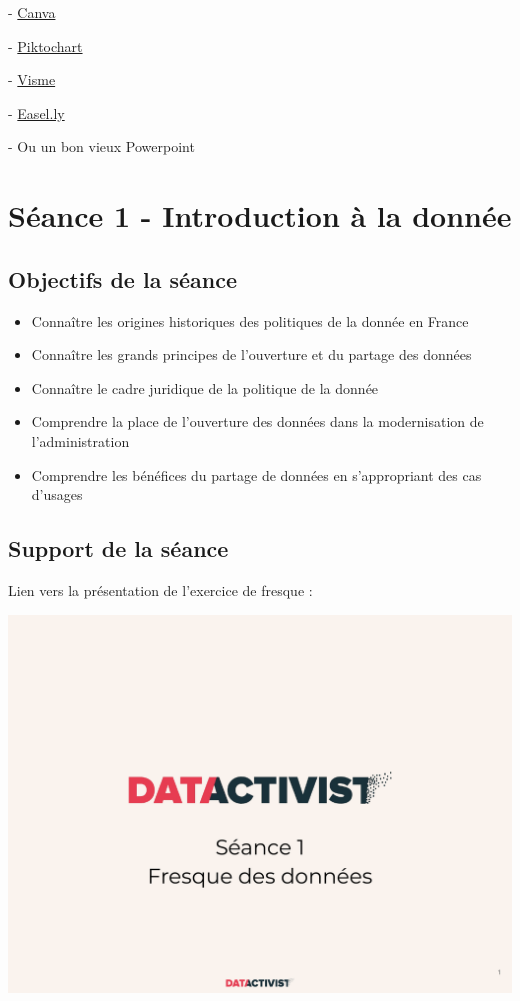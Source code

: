 \documentclass[
  letterpaper,
  DIV=11,
  numbers=noendperiod]{scrreprt}
\begin{document}
- \href{https://www.canva.com/}{Canva}

- \href{https://piktochart.com/}{Piktochart}

- \href{https://www.visme.co/make-infographics/}{Visme}

- \href{https://www.easel.ly/}{Easel.ly}

- Ou un bon vieux Powerpoint


\hypertarget{suxe9ance-1---introduction-uxe0-la-donnuxe9e}{%
\chapter{Séance 1 - Introduction à la
donnée}\label{suxe9ance-1---introduction-uxe0-la-donnuxe9e}}

\hypertarget{objectifs-de-la-suxe9ance}{%
\section{Objectifs de la séance}\label{objectifs-de-la-suxe9ance}}

\begin{itemize}
\item
  Connaître les origines historiques des politiques de la donnée en
  France
\item
  Connaître les grands principes de l'ouverture et du partage des
  données
\item
  Connaître le cadre juridique de la politique de la donnée
\item
  Comprendre la place de l'ouverture des données dans la modernisation
  de l'administration
\item
  Comprendre les bénéfices du partage de données en s'appropriant des
  cas d'usages
\end{itemize}

\hypertarget{support-de-la-suxe9ance}{%
\section{Support de la séance}\label{support-de-la-suxe9ance}}

Lien vers la présentation de l'exercice de fresque :

\includegraphics{./images/Séance 1 - 7 février 2024.pdf}
\end{document}
